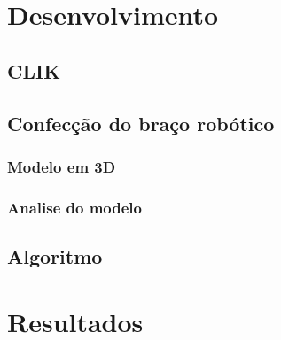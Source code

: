 \chapter{Desenvolvimento}
\section{CLIK}

\section{Confecção do braço robótico}
\subsection{Modelo em 3D}
\subsection{Analise do modelo}

\section{Algoritmo}

\chapter{Resultados}